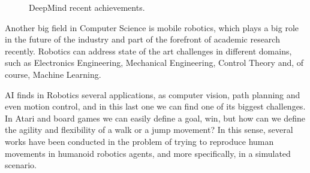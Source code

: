 \begin{figure}[ht]
	 \caption{DeepMind recent achievements.}
	\label{fig:deepmind_examples}
\end{figure}



Another big field in Computer Science is mobile robotics, which plays a big role in the future of the industry and part of the forefront of academic research recently. Robotics can address state of the art challenges in different domains, such as Electronics Engineering, Mechanical Engineering, Control Theory and, of course, Machine Learning.

AI finds in Robotics several applications, as computer vision, path planning and even motion control, and in this last one we can find one of its biggest challenges. In Atari and board games we can easily define a goal, win, but how can we define the agility and flexibility of a walk or a jump movement? In this sense, several works have been conducted in the problem of trying to reproduce human movements in humanoid robotics agents, and more specifically, in a simulated scenario.

